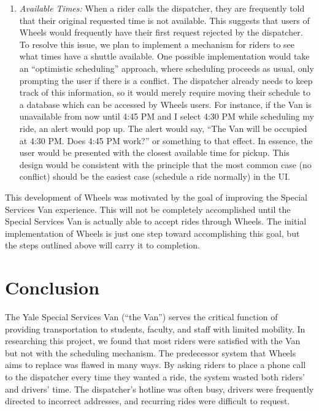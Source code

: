 \documentclass[12pt, a4paper]{article}
\begin{document}
\begin{multicols*}{2}
\begin{enumerate}[label=(\roman*)]
	\item \textit{Available Times:} When a rider calls the dispatcher, they are frequently told that their original requested time is not available. This suggests that users of Wheels would frequently have their first request rejected by the dispatcher. To resolve this issue, we plan to implement a mechanism for riders to see what times have a shuttle available. One possible implementation would take an ``optimistic scheduling'' approach, where scheduling proceeds as usual, only prompting the user if there is a conflict. The dispatcher already needs to keep track of this information, so it would merely require moving their schedule to a database which can be accessed by Wheels users. For instance, if the Van is unavailable from now until 4:45 PM and I select 4:30 PM while scheduling my ride, an alert would pop up. The alert would say, ``The Van will be occupied at 4:30 PM. Does 4:45 PM work?'' or something to that effect. In essence, the user would be presented with the closest available time for pickup. This design would be consistent with the principle that the most common case (no conflict) should be the easiest case (schedule a ride normally) in the UI.
\end{enumerate}
This development of Wheels was motivated by the goal of improving the Special Services Van experience. This will not be completely accomplished until the Special Services Van is actually able to accept rides through Wheels. The initial implementation of Wheels is just one step toward accomplishing this goal, but the steps outlined above will carry it to completion.

\section{Conclusion}\label{sec:conclusion}
The Yale Special Services Van (``the Van'') serves the critical function of providing transportation to students, faculty, and staff with limited mobility. In researching this project, we found that most riders were satisfied with the Van but not with the scheduling mechanism. The predecessor system that Wheels aims to replace was flawed in many ways. By asking riders to place a phone call to the dispatcher every time they wanted a ride, the system wasted both riders' and drivers' time. The dispatcher's hotline was often busy, drivers were frequently directed to incorrect addresses, and recurring rides were difficult to request.


\end{multicols*}
\end{document}
